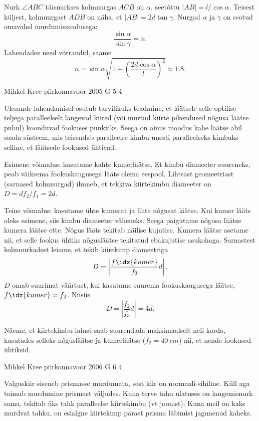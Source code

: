\documentclass[11pt, twoside]{article}
\begin{document}
{{Nurk $\angle ABC$ täisnurkses kolmnurgas $ACB$ on $\alpha$, seetõttu $|AB| = l/ \cos \alpha$. Teisest küljest, kolmnurgast $ADB$ on näha, et $|AB| = 2d \tan \gamma$. Nurgad $\alpha$ ja $\gamma$ on seotud omavahel murdumisseadusega:
\[
\frac{\sin\alpha}{\sin\gamma} = n.
\]
Lahendades need võrrandid, saame
\[
n=\sin \alpha \sqrt{1+\left(\frac{2 d \cos \alpha}{l}\right)^{2}} \approx \num{1,8}.
\]
\fi
}

{Mihkel Kree} %
{piirkonnavoor} %
{2005} %
{G 5} %
{4} %
{

\ifSolution
Ülesande lahendamisel osutub tarvilikuks teadmine, et läätsele selle optilise teljega paralleelselt langevad kiired (või murtud kiirte pikendused nõgusa läätse puhul) koonduvad fookuses punktiks. Seega on ainus moodus kahe läätse abil saada süsteem, mis teisendab paralleelse kimbu uuesti paralleelseks kimbuks selline, et läätsede fookused ühtivad. 

Esimene võimalus: kasutame kahte kumerläätse. Et kimbu diameeter suureneks, peab väiksema fookuskaugusega lääts olema eespool. Lihtsast geomeetriast (sarnased kolmnurgad) ilmneb, et tekkiva kiirtekimbu diameeter on $D = df_2/f_1 = 2d$.

Teine võimalus: kasutame ühte kumerat ja ühte nõgusat läätse. Kui kumer lääts oleks esimene, siis kimbu diameeter väheneks. Seega paigutame nõgusa läätse kumera läätse ette. Nõgus lääts tekitab näilise kujutise. Kumera läätse asetame nii, et selle fookus ühtiks nõgusläätse tekitatud ebakujutise asukohaga. Sarnastest kolmnurkadest leiame, et tekib kiirekimp diameetriga
\[
D = \left|\frac{f\idx{kumer}}{f_3}d\right|.
\]
$D$ omab suurimat väärtust, kui kasutame suurema fookuskaugusega läätse, $f\idx{kumer} = f_2$. Niisiis
\[
D = \left|\frac{f_2}{f_3}d\right| = 4d.
\]


Näeme, et kiirtekimbu laiust saab suurendada maksimaalselt neli korda, kasutades selleks nõgusläätse ja kumerläätse ($f_2 = \SI{40}{cm}$) nii, et nende fookused ühtiksid.
\fi
}

{Mihkel Kree} %
{piirkonnavoor} %
{2006} %
{G 6} %
{4} %
{

\ifSolution
Valguskiir siseneb prismasse murdumata, sest kiir on normaali-sihiline. Küll aga toimub murdumine prismast väljudes. Kuna terve tahu ulatuses on langemisnurk sama, tekitab üks tahk paralleelse kiirtekimbu (vt joonist). Kuna meil on kaks murdvat tahku, on esialgne kiirtekimp pärast prisma läbimist jagunenud kaheks.

}}
\end{document}
